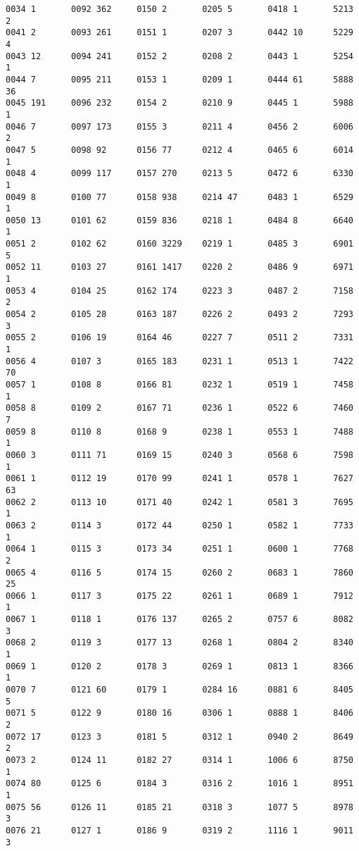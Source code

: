 \begin{verbatim}
0034 1       0092 362     0150 2       0205 5       0418 1       5213 2
0041 2       0093 261     0151 1       0207 3       0442 10      5229 4
0043 12      0094 241     0152 2       0208 2       0443 1       5254 1
0044 7       0095 211     0153 1       0209 1       0444 61      5888 36
0045 191     0096 232     0154 2       0210 9       0445 1       5988 1
0046 7       0097 173     0155 3       0211 4       0456 2       6006 2
0047 5       0098 92      0156 77      0212 4       0465 6       6014 1
0048 4       0099 117     0157 270     0213 5       0472 6       6330 1
0049 8       0100 77      0158 938     0214 47      0483 1       6529 1
0050 13      0101 62      0159 836     0218 1       0484 8       6640 1
0051 2       0102 62      0160 3229    0219 1       0485 3       6901 5
0052 11      0103 27      0161 1417    0220 2       0486 9       6971 1
0053 4       0104 25      0162 174     0223 3       0487 2       7158 2
0054 2       0105 28      0163 187     0226 2       0493 2       7293 3
0055 2       0106 19      0164 46      0227 7       0511 2       7331 1
0056 4       0107 3       0165 183     0231 1       0513 1       7422 70
0057 1       0108 8       0166 81      0232 1       0519 1       7458 1
0058 8       0109 2       0167 71      0236 1       0522 6       7460 7
0059 8       0110 8       0168 9       0238 1       0553 1       7488 1
0060 3       0111 71      0169 15      0240 3       0568 6       7598 1
0061 1       0112 19      0170 99      0241 1       0578 1       7627 63
0062 2       0113 10      0171 40      0242 1       0581 3       7695 1
0063 2       0114 3       0172 44      0250 1       0582 1       7733 1
0064 1       0115 3       0173 34      0251 1       0600 1       7768 2
0065 4       0116 5       0174 15      0260 2       0683 1       7860 25
0066 1       0117 3       0175 22      0261 1       0689 1       7912 1
0067 1       0118 1       0176 137     0265 2       0757 6       8082 3
0068 2       0119 3       0177 13      0268 1       0804 2       8340 1
0069 1       0120 2       0178 3       0269 1       0813 1       8366 1
0070 7       0121 60      0179 1       0284 16      0881 6       8405 5
0071 5       0122 9       0180 16      0306 1       0888 1       8406 2
0072 17      0123 3       0181 5       0312 1       0940 2       8649 2
0073 2       0124 11      0182 27      0314 1       1006 6       8750 1
0074 80      0125 6       0184 3       0316 2       1016 1       8951 1
0075 56      0126 11      0185 21      0318 3       1077 5       8978 3
0076 21      0127 1       0186 9       0319 2       1116 1       9011 3

\end{verbatim}
